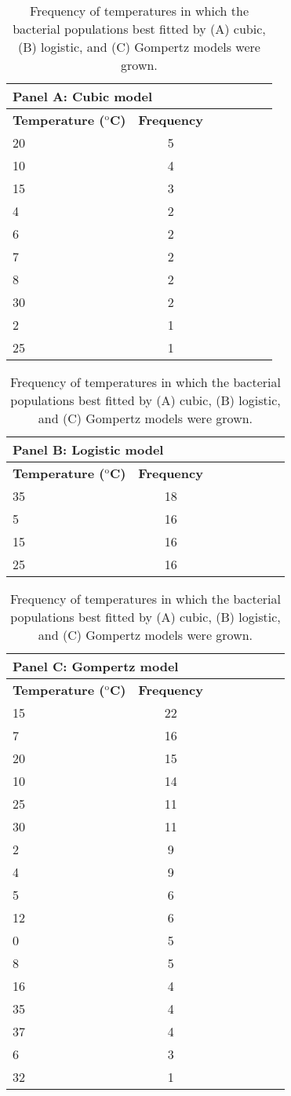 \documentclass[11pt]{article}
\newcommand{\supersc}[1]{\ensuremath{^{\textrm{#1}}}}
\begin{document}
			\begin{table}[htbp]
		\caption{Frequency of temperatures in which the bacterial populations best fitted by (A) cubic, (B) logistic, and (C) Gompertz models were grown.}
		\label{table4}
		\begin{tabularx}{\linewidth}{l*{6}{c}}
			\toprule
			\multicolumn{7}{l}{\textbf{Panel A: Cubic model}} \\
			\midrule
			\textbf{Temperature (\supersc{o}C)} & \textbf{Frequency} \\
			20 & 5 \\
			10 & 4 \\
			15 & 3 \\
			4 & 2 \\
			6 & 2 \\
			7 & 2 \\
			8 & 2 \\
			30 & 2 \\
			2 & 1 \\
			25 & 1 \\
			\bottomrule   
		\end{tabularx}
		\begin{tabularx}{\linewidth}{l*{7}{c}}
			\toprule
			\multicolumn{7}{l}{\textbf{Panel B: Logistic model}} \\
			\midrule
			\textbf{Temperature (\supersc{o}C)} & \textbf{Frequency} \\
			35 & 18 \\
			5 & 16 \\
			15 & 16 \\
			25 & 16 \\
			\bottomrule
		\end{tabularx}
		\begin{tabularx}{\linewidth}{l*{7}{c}}
			\toprule
			\multicolumn{7}{l}{\textbf{Panel C: Gompertz model}} \\
			\midrule
			\textbf{Temperature (\supersc{o}C)} & \textbf{Frequency} \\
			15 & 22 \\
			7 & 16 \\
			20 & 15 \\
			10 & 14 \\
			25 & 11 \\
			30 & 11 \\
			2 & 9 \\
			4 & 9 \\
			5 & 6 \\
			12 & 6 \\
			0 & 5 \\
			8 & 5 \\
			16 & 4 \\
			35 & 4 \\
			37 & 4 \\
			6 & 3 \\
			32 & 1 \\
			\bottomrule
		\end{tabularx}
	\end{table}
\end{document}
